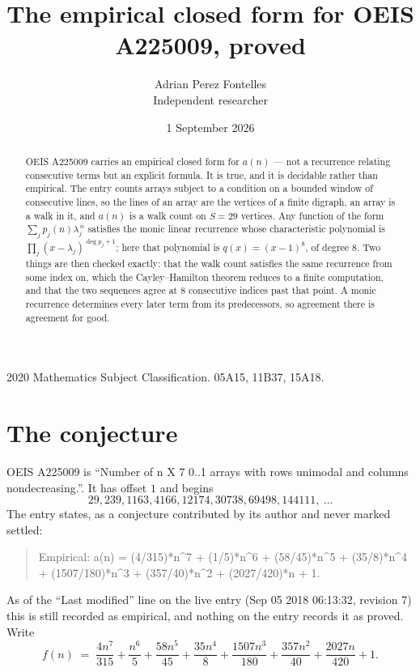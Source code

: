 \documentclass[11pt,a4paper]{article}
\title{The empirical closed form for OEIS A225009, proved}
\author{Adrian Perez Fontelles\\ \small Independent researcher}
\date{1 September 2026}
\theoremstyle{plain}
\theoremstyle{definition}
\begin{document}
\maketitle

\begin{abstract}
OEIS A225009 carries an empirical closed form for $a(n)$ --- not a recurrence relating
consecutive terms but an explicit formula. It is true, and it is decidable rather than
empirical. The entry counts arrays subject to a condition on a bounded window of consecutive lines, so the lines of an array are the
vertices of a finite digraph, an array is a walk in it, and $a(n)$ is a walk count on
$S=29$ vertices. Any function of the form $\sum_j p_j(n)\lambda_j^{\,n}$ satisfies the
monic linear recurrence whose characteristic polynomial is
$\prod_j(x-\lambda_j)^{\deg p_j+1}$; here that polynomial is $q(x)=(x-1)^{8}$, of degree
$8$. Two things are then checked exactly: that the walk count satisfies the same
recurrence from some index on, which the Cayley--Hamilton theorem reduces to a finite
computation, and that the two sequences agree at $8$ consecutive indices past that
point. A monic recurrence determines every later term from its predecessors, so agreement
there is agreement for good.
\end{abstract}

\noindent\small 2020 Mathematics Subject Classification. 05A15, 11B37, 15A18.\normalsize

\section{The conjecture}

OEIS A225009 is ``Number of n X 7 0..1 arrays with rows unimodal and columns nondecreasing.''. It has offset $1$ and begins
\[
29, 239, 1163, 4166, 12174, 30738, 69498, 144111,\ \dots
\]
The entry states, as a conjecture contributed by its author and never marked settled:
\begin{quote}
Empirical: a(n) = (4/315)*n\^{}7 + (1/5)*n\^{}6 + (58/45)*n\^{}5 + (35/8)*n\^{}4 + (1507/180)*n\^{}3 + (357/40)*n\^{}2 + (2027/420)*n + 1.
\end{quote}
As of the ``Last modified'' line on the live entry (Sep 05 2018 06:13:32, revision 7) this is still
recorded as empirical, and nothing on the entry records it as proved. Write
\[
f(n)\;=\;\frac{4 n^{7}}{315} + \frac{n^{6}}{5} + \frac{58 n^{5}}{45} + \frac{35 n^{4}}{8} + \frac{1507 n^{3}}{180} + \frac{357 n^{2}}{40} + \frac{2027 n}{420} + 1.
\]
\end{document}
